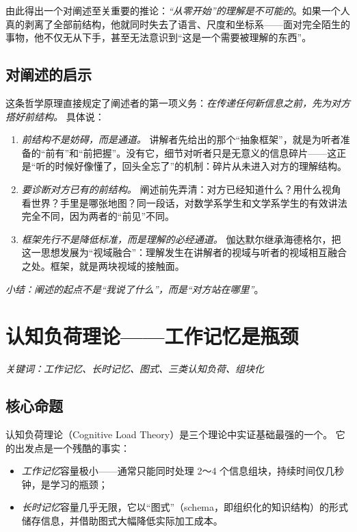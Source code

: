 由此得出一个对阐述至关重要的推论：\textit{“从零开始”的理解是不可能的}。如果一个人真的剥离了全部前结构，他就同时失去了语言、尺度和坐标系——面对完全陌生的事物，他不仅无从下手，甚至无法意识到“这是一个需要被理解的东西”。

\subsection{对阐述的启示}

这条哲学原理直接规定了阐述者的第一项义务：\textit{在传递任何新信息之前，先为对方搭好前结构。}
具体说：

\begin{enumerate}[label=\arabic*.]
    \item \textit{前结构不是妨碍，而是通道。} 讲解者先给出的那个“抽象框架”，就是为听者准备的“前有”和“前把握”。没有它，细节对听者只是无意义的信息碎片——这正是“听的时候好像懂了，回头全忘了”的机制：碎片从未进入对方的理解结构。
    \item \textit{要诊断对方已有的前结构。} 阐述前先弄清：对方已经知道什么？用什么视角看世界？手里是哪张地图？同一段话，对数学系学生和文学系学生的有效讲法完全不同，因为两者的“前见”不同。
    \item \textit{框架先行不是降低标准，而是理解的必经通道。} 伽达默尔继承海德格尔，把这一思想发展为“视域融合”：理解发生在讲解者的视域与听者的视域相互融合之处。框架，就是两块视域的接触面。
\end{enumerate}

\nid\textit{小结：阐述的起点不是“我说了什么”，而是“对方站在哪里”}。

\section{认知负荷理论——工作记忆是瓶颈}

\noindent\textit{关键词：工作记忆、长时记忆、图式、三类认知负荷、组块化}

\subsection{核心命题}

认知负荷理论（Cognitive Load Theory）是三个理论中实证基础最强的一个。
它的出发点是一个残酷的事实：
\begin{itemize}
    \item \textit{工作记忆}容量极小——通常只能同时处理 2～4 个信息组块，持续时间仅几秒钟，是学习的瓶颈；
    \item \textit{长时记忆}容量几乎无限，它以“图式”（schema，即组织化的知识结构）的形式储存信息，并借助图式大幅降低实际加工成本。
\end{itemize}

